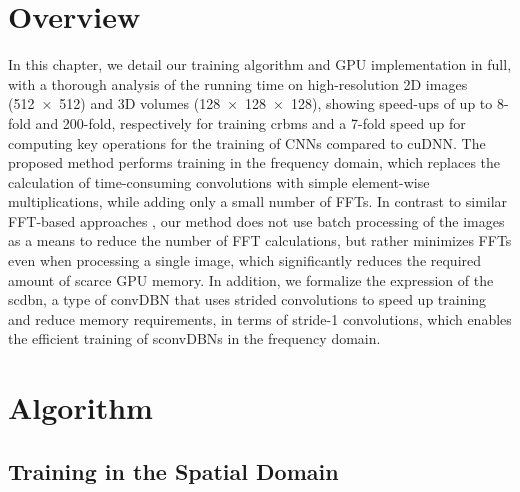 \section{Overview}

In this chapter, we detail our training algorithm and GPU implementation in
full, with a thorough analysis of the running time on high-resolution 2D images
(\num{512x512}) and 3D volumes (\num{128x128x128}), showing speed-ups of up to
8-fold and 200-fold, respectively for training \glspl{crbm} and a 7-fold speed
up for computing key operations for the training of CNNs compared to cuDNN. The
proposed method performs training in the frequency domain, which replaces the
calculation of time-consuming convolutions with simple element-wise
multiplications, while adding only a small number of FFTs. In contrast to
similar FFT-based approaches \citep[e.g.,][]{mathieu2013}, our method does not
use batch processing of the images as a means to reduce the number of FFT
calculations, but rather minimizes FFTs even when processing a single image,
which significantly reduces the required amount of scarce GPU memory.
In addition, we formalize the expression of the \gls{scdbn}, a type of convDBN
that uses strided convolutions to speed up training and reduce memory
requirements, in terms of stride-1 convolutions, which enables the efficient
training of sconvDBNs in the frequency domain.


\section{Algorithm}


\subsection[Training in the spatial domain]{Training in the Spatial Domain}

